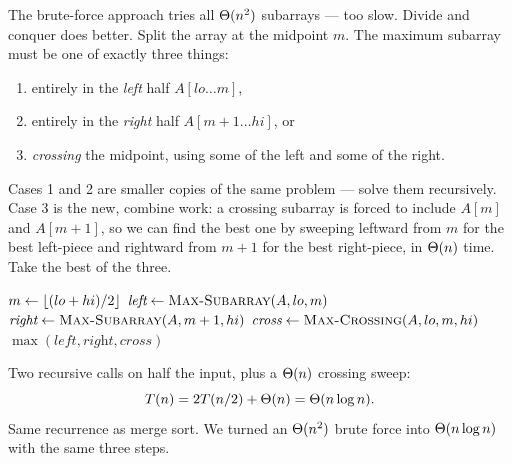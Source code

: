 The brute-force approach tries all $\Theta(n^2)$ subarrays --- too slow. Divide and
conquer does better. Split the array at the midpoint $m$. The maximum subarray
must be one of exactly three things:

\begin{enumerate}
\item entirely in the \emph{left} half $A[lo\ldots m]$,
\item entirely in the \emph{right} half $A[m+1\ldots hi]$, or
\item \emph{crossing} the midpoint, using some of the left and some of the right.
\end{enumerate}

Cases 1 and 2 are smaller copies of the same problem --- solve them recursively.
Case 3 is the new, combine work: a crossing subarray is forced to include
$A[m]$ and $A[m+1]$, so we can find the best one by sweeping leftward from $m$ for
the best left-piece and rightward from $m+1$ for the best right-piece, in
$\Theta(n)$ time. Take the best of the three.

\begin{center}
\end{center}

\begin{algorithm}[H]
\caption{\textsc{Max-Subarray}$(A, lo, hi)$}
$m \gets \lfloor(lo+hi)/2\rfloor$\;
$\textit{left} \gets \textsc{Max-Subarray}(A, lo, m)$\;
$\textit{right} \gets \textsc{Max-Subarray}(A, m+1, hi)$\;
$\textit{cross} \gets \textsc{Max-Crossing}(A, lo, m, hi)$
\Return $\max(\textit{left}, \textit{right}, \textit{cross})$\;
\end{algorithm}

Two recursive calls on half the input, plus a $\Theta(n)$ crossing sweep:
\[T(n) = 2T(n/2) + \Theta(n) = \Theta(n\log n).\]
Same recurrence as merge sort. We turned an $\Theta(n^2)$ brute force into
$\Theta(n\log n)$ with the same three steps.

